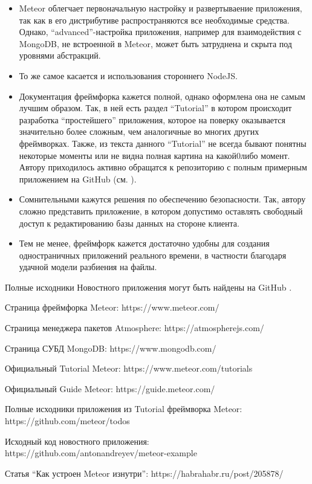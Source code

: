 \documentclass[a4paper,12pt]{article}
\begin{document}
\begin{itemize}
	\item Meteor облегчает первоначальную настройку и развертываение приложения,
	так как в его дистрибутиве распространяются все необходимые средства. Однако,
	``advanced''-настройка приложения, например для взаимодействия с MongoDB,
	не встроенной в Meteor, может быть затруднена и скрыта под уровнями абстракций.
	\item То же самое касается и использования стороннего NodeJS.
	\item Документация фреймфорка кажется полной, однако оформлена она не самым лучшим
	образом. Так, в ней есть раздел ``Tutorial'' в котором происходит разработка
	``простейшего'' приложения, которое на поверку оказывается значительно более
	сложным, чем аналогичные во многих других фреймворках. Также, из текста данного 
	``Tutorial'' не всегда бывают понятны некоторые моменты или не видна
	полная картина на какой0либо момент. Автору приходилось активно обращатся 
	к репозиторию с полным примерным приложением на GitHub (см. \cite{todos}).
	\item Сомнительными кажутся решения по обеспечению безопасности.
	Так, автору сложно представить приложение, в котором допустимо оставлять
	свободный доступ к редактированию базы данных на стороне клиента.
	\item Тем не менее, фреймфорк кажется достаточно удобны для создания 
	одностраничных приложений реального времени, в частности благодаря
	удачной модели разбиения на файлы. 
\end{itemize}

Полные исходники Новостного приложения могут быть найдены на GitHub \cite{news-app}.

\begin{thebibliography}{99}
 Страница фреймфорка Meteor:
https://www.meteor.com/	

 Страница менеджера пакетов Atmosphere:
https://atmospherejs.com/

 Страница СУБД MongoDB:
https://www.mongodb.com/

 Официальный Tutorial Meteor:
https://www.meteor.com/tutorials

 Официальный Guide Meteor:
https://guide.meteor.com/
	
 Полные исходники приложения из Tutorial фреймворка Meteor:
https://github.com/meteor/todos	
	
	Исходный код новостного приложения: 
https://github.com/antonandreyev/meteor-example
	
 Статья ``Как устроен Meteor изнутри'':
https://habrahabr.ru/post/205878/	
	
\end{thebibliography}
\end{document}
